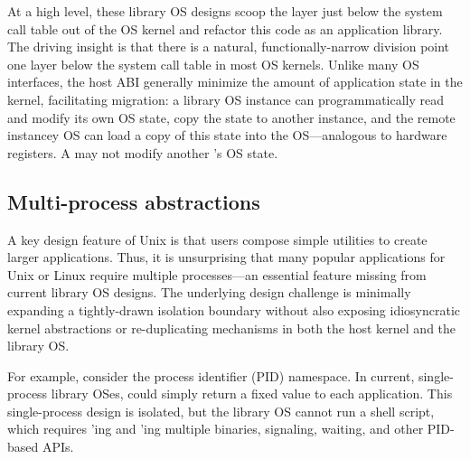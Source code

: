 At a high level, these library OS designs
scoop the layer just below the system call table out of the OS kernel
and refactor this code as an application library.  
The driving insight is that there is a natural, functionally-narrow division point 
one layer below the system call table
in most OS kernels.
Unlike many OS interfaces, the host ABI generally minimize the amount of application state in the kernel, facilitating
migration: a library OS instance can programmatically read and modify its own OS state, copy the state to another instance, and the remote instancey OS can 
load a copy of this state into the OS---analogous to hardware registers.
A \picoproc{} may not modify another \picoproc{}'s OS state.



\subsection{Multi-process abstractions}
\label{sec:overview:libos:multiproc}


A key design feature of Unix is that users compose simple utilities to create larger applications.  Thus, it is unsurprising that many popular applications for Unix or Linux require multiple processes---an essential feature missing from current library OS designs.
The underlying design challenge is minimally expanding a tightly-drawn isolation boundary without also exposing idiosyncratic kernel abstractions or re-duplicating mechanisms in both the host kernel and the library OS.


For example, consider the process identifier (PID) namespace. In current, single-process library OSes,  could simply return a fixed value to each application.
This single-process design is isolated, but the library OS cannot run a shell script, which requires 'ing and 'ing multiple binaries, signaling, waiting, and other PID-based APIs.

